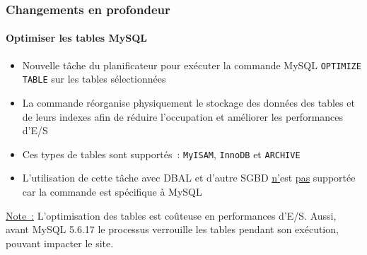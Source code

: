 \begin{frame}[fragile]
	\frametitle{Changements en profondeur}
	\framesubtitle{Optimiser les tables MySQL}

	\begin{itemize}

		\item Nouvelle tâche du planificateur pour exécuter la commande MySQL \texttt{OPTIMIZE TABLE}
			sur les tables sélectionnées

		\item La commande réorganise physiquement le stockage des données des tables et de leurs indexes
			afin de réduire l'occupation et améliorer les performances d'E/S

		\item Ces types de tables sont supportés~:\newline
			\texttt{MyISAM}, \texttt{InnoDB} et \texttt{ARCHIVE}

		\item L'utilisation de cette tâche avec DBAL et d'autre SGBD \underline{n'}est
			\underline{pas} supportée car la commande est spécifique à MySQL

	\end{itemize}


	\begingroup
		\color{red}
			\small
				\underline{Note~:} L'optimisation des tables est coûteuse en performances d'E/S.
				Aussi, avant MySQL 5.6.17 le processus verrouille les tables pendant son exécution,
				pouvant impacter le site.
			\normalsize
	\endgroup

\end{frame}


